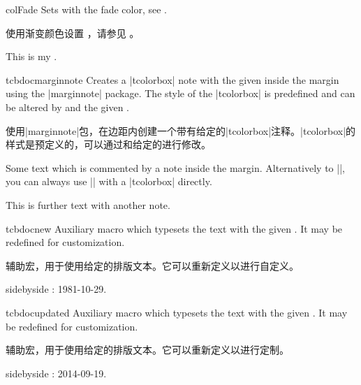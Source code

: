 \begin{docCommand}[doc new=2019-09-18]{colFade}{}
Sets  with the fade color, see .

使用渐变颜色设置 ，请参见 。
\begin{dispExample}
This is my .
\end{dispExample}
\end{docCommand}


\begin{docCommand}[doc new=2014-09-19]{tcbdocmarginnote}{}
Creates a |tcolorbox| note with the given  inside the margin using
the |marginnote| package. The style of the |tcolorbox| is predefined and can be
altered by  and the given .

使用|marginnote|包，在边距内创建一个带有给定的|tcolorbox|注释。|tcolorbox|的样式是预定义的，可以通过和给定的进行修改。
\begin{dispExample}
Some text
which is commented by a note inside the margin.
Alternatively to |\tcbdocmarginnote|, you can always use
|\marginnote| with a |tcolorbox| directly.\par
This is further text%
with another note.
\end{dispExample}
\end{docCommand}

\begin{docCommand}[doc new=2014-09-19]{tcbdocnew}{}
Auxiliary macro which typesets the  text with
the given . It may be redefined for customization.

辅助宏，用于使用给定的排版文本。它可以重新定义以进行自定义。 

\makeatletter\renewcommand*{\tcbdocnew}[1]{\kvtcb@text@new: #1}\makeatother%
\begin{dispExample*}{sidebyside}
\tcbdocnew{1981-10-29}.
\tcbdocmarginnote{\tcbdocnew{1978-02-09}}
\end{dispExample*}
\end{docCommand}

\begin{docCommand}[doc new=2014-09-19]{tcbdocupdated}{}
Auxiliary macro which typesets the  text with
the given . It may be redefined for customization.

辅助宏，用于使用给定的排版文本。它可以重新定义以进行定制。

\makeatletter\renewcommand*{\tcbdocupdated}[1]{\kvtcb@text@updated: #1}\makeatother%
\begin{dispExample*}{sidebyside}
\tcbdocupdated{2014-09-19}.
\end{dispExample*}
\end{docCommand}

